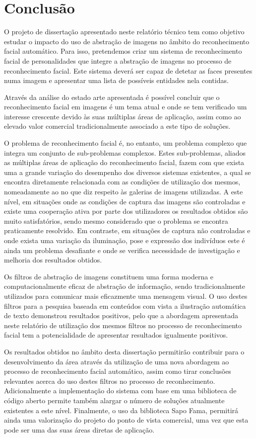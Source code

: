 \chapter{Conclusão} \label{chap:conclusao}
O projeto de dissertação apresentado neste relatório técnico tem como objetivo estudar o impacto do uso de abstração de imagens no âmbito do reconhecimento facial automático. Para isso, pretendemos criar um sistema de reconhecimento facial de personalidades que integre a abstração de imagens no processo de reconhecimento facial. Este sistema deverá ser capaz de detetar as faces presentes numa imagem e apresentar uma lista de possíveis entidades nela contidas.

Através da análise do estado arte apresentada é possível concluir que o reconhecimento facial em imagens é um tema atual e onde se tem verificado um interesse crescente devido às suas múltiplas áreas de aplicação, assim como ao elevado valor comercial tradicionalmente associado a este tipo de soluções. 

O problema de reconhecimento facial é, no entanto, um problema complexo que integra um conjunto de sub-problemas  complexos. Estes sub-problemas, aliados as múltiplas áreas de aplicação do reconhecimento facial, fazem com que exista uma a grande variação do desempenho dos diversos sistemas existentes, a qual se encontra diretamente relacionada com as condições de utilização dos mesmos, nomeadamente ao no que diz respeito às galerias de imagens utilizadas. A este nível, em situações onde as condições de captura das imagens são controladas e existe uma cooperação ativa por parte dos utilizadores os resultados obtidos são muito satisfatórios, sendo mesmo considerado que o problema se encontra praticamente resolvido. Em contraste, em situações de captura não controladas e onde exista uma variação da iluminação, pose e expressão dos indivíduos este é ainda um problema desafiante e onde se verifica necessidade de investigação e melhoria dos resultados obtidos.

Os filtros de abstração de imagens constituem uma forma moderna e computacionalmente eficaz de abstração de informação, sendo tradicionalmente utilizados para comunicar mais eficazmente uma mensagem visual. O uso destes filtros para a pesquisa baseada em conteúdos com vista a ilustração automática de texto demonstrou resultados positivos, pelo que a abordagem apresentada neste relatório de utilização dos mesmos filtros no processo de reconhecimento facial tem a potencialidade de apresentar resultados igualmente positivos.

Os resultados obtidos no âmbito desta dissertação permitirão contribuir para o desenvolvimento da área através da utilização de uma nova abordagem ao processo de reconhecimento facial automático, assim como tirar conclusões relevantes acerca do uso destes filtros no processo de reconhecimento. Adicionalmente a implementação do sistema com base em uma biblioteca de código aberto permite também alargar o número de soluções atualmente existentes a este nível. Finalmente, o uso da biblioteca Sapo Fama, permitirá ainda uma valorização do projeto  do ponto de vista comercial, uma vez que esta pode ser uma das suas áreas diretas de aplicação.